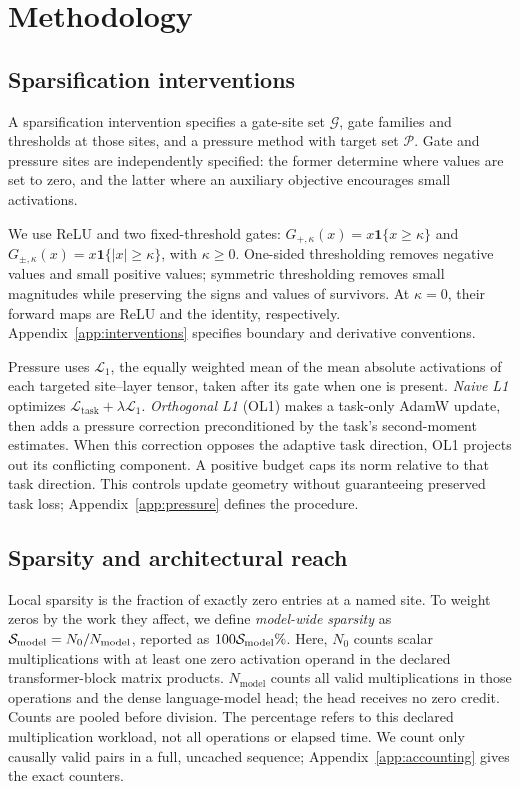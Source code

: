 \section{Methodology}
\label{sec:methodology}

\subsection{Sparsification interventions}
\label{sec:interventions}

A sparsification intervention specifies a gate-site set $\mathcal{G}$, gate
families and thresholds at those sites, and a pressure method with target set
$\mathcal{P}$. Gate and pressure sites are independently specified: the former
determine where values are set to zero, and the latter where an auxiliary
objective encourages small activations.

We use ReLU and two fixed-threshold gates:
$G_{+,\kappa}(x)=x\mathbf{1}\{x\geq\kappa\}$ and
$G_{\pm,\kappa}(x)=x\mathbf{1}\{|x|\geq\kappa\}$, with $\kappa\geq0$.
One-sided thresholding removes negative values and small positive values;
symmetric thresholding removes small magnitudes while preserving the signs
and values of survivors. At $\kappa=0$, their forward maps are ReLU and the
identity, respectively. Appendix~\ref{app:interventions} specifies boundary
and derivative conventions.

Pressure uses $\mathcal{L}_1$, the equally weighted mean of the mean absolute
activations of each targeted site--layer tensor, taken after its gate when
one is present.
\emph{Naive L1} optimizes $\mathcal{L}_{\mathrm{task}}+\lambda\mathcal{L}_1$.
\emph{Orthogonal L1} (OL1) makes a task-only AdamW update, then adds a pressure
correction preconditioned by the task's second-moment estimates. When this
correction opposes the adaptive task direction, OL1 projects out its
conflicting component. A positive budget caps its norm relative to that task
direction. This controls update geometry without guaranteeing preserved task
loss; Appendix~\ref{app:pressure} defines the procedure.

\subsection{Sparsity and architectural reach}
\label{sec:measurement}

Local sparsity is the fraction of exactly zero entries at a named site.
To weight zeros by the work they affect, we define \emph{model-wide sparsity}
as $\mathcal{S}_{\mathrm{model}}=N_0/N_{\mathrm{model}}$, reported as $100\mathcal{S}_{\mathrm{model}}\%$. Here, $N_0$
counts scalar multiplications with at least one zero activation operand in
the declared transformer-block matrix products. $N_{\mathrm{model}}$ counts all valid multiplications
in those operations and the dense language-model head; the head receives no
zero credit. Counts are pooled before division. The percentage refers to this
declared multiplication workload, not all operations or elapsed time. We count
only causally valid pairs in a full, uncached sequence;
Appendix~\ref{app:accounting} gives the exact counters.

